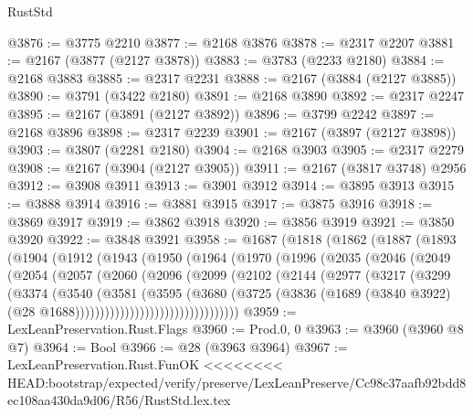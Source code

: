 \begin{lexlean}{RustStd}
\begin{coremodule}
{\begin{coremodule}
{{{{{{{{{{{{{{{{@3876 := @3775 @2210
@3877 := @2168 @3876
@3878 := @2317 @2207
@3881 := @2167 (@3877 (@2127 @3878))
@3883 := @3783 (@2233 @2180)
@3884 := @2168 @3883
@3885 := @2317 @2231
@3888 := @2167 (@3884 (@2127 @3885))
@3890 := @3791 (@3422 @2180)
@3891 := @2168 @3890
@3892 := @2317 @2247
@3895 := @2167 (@3891 (@2127 @3892))
@3896 := @3799 @2242
@3897 := @2168 @3896
@3898 := @2317 @2239
@3901 := @2167 (@3897 (@2127 @3898))
@3903 := @3807 (@2281 @2180)
@3904 := @2168 @3903
@3905 := @2317 @2279
@3908 := @2167 (@3904 (@2127 @3905))
@3911 := @2167 (@3817 @3748) @2956
@3912 := @3908 @3911
@3913 := @3901 @3912
@3914 := @3895 @3913
@3915 := @3888 @3914
@3916 := @3881 @3915
@3917 := @3875 @3916
@3918 := @3869 @3917
@3919 := @3862 @3918
@3920 := @3856 @3919
@3921 := @3850 @3920
@3922 := @3848 @3921
@3958 := @1687
    (@1818
      (@1862
        (@1887
          (@1893
            (@1904
              (@1912
                (@1943
                  (@1950
                    (@1964
                      (@1970
                        (@1996
                          (@2035
                            (@2046
                              (@2049
                                (@2054
                                  (@2057
                                    (@2060
                                      (@2096
                                        (@2099
                                          (@2102
                                            (@2144
                                              (@2977
                                                (@3217
                                                  (@3299
                                                    (@3374
                                                      (@3540
                                                        (@3581
                                                          (@3595
                                                            (@3680
                                                              (@3725
                                                                (@3836
                                                                  (@1689
                                                                    (@3840 @3922)
                                                                    (@28
                                                                      @1688)))))))))))))))))))))))))))))))))
@3959 := LexLeanPreservation.Rust.Flags
@3960 := Prod.{0, 0}
@3963 := @3960 (@3960 @8 @7)
@3964 := Bool
@3966 := @28 (@3963 @3964)
@3967 := LexLeanPreservation.Rust.FunOK
<<<<<<<< HEAD:bootstrap/expected/verify/preserve/LexLeanPreserve/Cc98c37aafb92bdd8ec108aa430da9d06/R56/RustStd.lex.tex
}}}}}}}}}}}}}}}}
\end{coremodule}}
\end{coremodule}
\end{lexlean}
